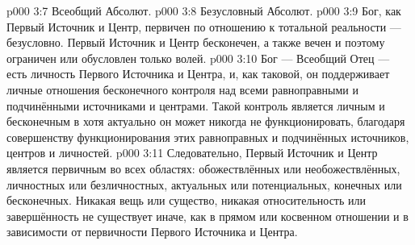 \vs p000 3:7 \bibnobreakspace Всеобщий Абсолют.
\vs p000 3:8 \bibnobreakspace Безусловный Абсолют.
\vs p000 3:9 \pc Бог, как Первый Источник и Центр, первичен по отношению к тотальной реальности --- безусловно. Первый Источник и Центр бесконечен, а также вечен и поэтому ограничен или обусловлен только волей.
\vs p000 3:10 Бог --- Всеобщий Отец --- есть личность Первого Источника и Центра, и, как таковой, он поддерживает личные отношения бесконечного контроля над всеми равноправными и подчинёнными источниками и центрами. Такой контроль является личным и бесконечным в  хотя актуально он может никогда не функционировать, благодаря совершенству функционирования этих равноправных и подчинённых источников, центров и личностей.
\vs p000 3:11 Следовательно, Первый Источник и Центр является первичным во всех областях: обожествлённых или необожествлённых, личностных или безличностных, актуальных или потенциальных, конечных или бесконечных. Никакая вещь или существо, никакая относительность или завершённость не существует иначе, как в прямом или косвенном отношении и в зависимости от первичности Первого Источника и Центра.
